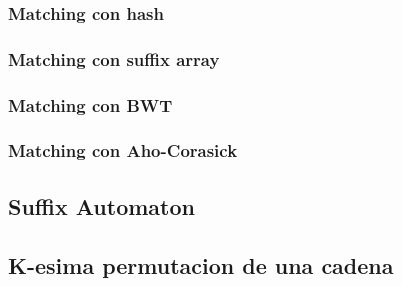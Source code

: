 \subsubsection{Matching con hash}

\subsubsection{Matching con suffix array}

\subsubsection{Matching con BWT}

\subsubsection{Matching con Aho-Corasick}
\subsection{Suffix Automaton}

\subsection{K-esima permutacion de una cadena}

